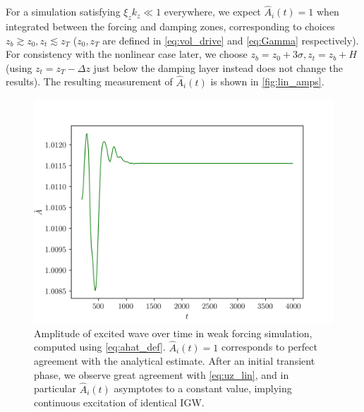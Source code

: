 \documentclass[
        fleqn,
        usenatbib,
    ]{mnras}
\begin{document}
For a simulation satisfying $\xi_z k_z \ll 1$ everywhere, we expect
$\hat{A}_i(t) = 1$ when integrated between the forcing and damping zones,
corresponding to choices $z_b \gtrsim z_0, z_t \lesssim z_T$ ($z_0, z_T$ are
defined in \autoref{eq:vol_drive} and \autoref{eq:Gamma} respectively). For
consistency with the nonlinear case later, we choose $z_b = z_0 + 3\sigma, z_t =
z_b + H$ (using $z_t = z_T - \Delta z$ just below the damping layer instead does
not change the results). The resulting measurement of $\hat{A}_i(t)$ is shown in
\autoref{fig:lin_amps}.
\begin{figure}
    \centering
    \includegraphics[width=\columnwidth]{plots/lin_amps.png}
    \caption{Amplitude of excited wave over time in weak forcing simulation,
    computed using \autoref{eq:ahat_def}. $\hat{A}_i(t) = 1$ corresponds to
    perfect agreement with the analytical estimate. After an initial transient
    phase, we observe great agreement with \autoref{eq:uz_lin}, and in
    particular $\hat{A}_i(t)$ asymptotes to a constant value, implying continuous
    excitation of identical IGW.}\label{fig:lin_amps}
\end{figure}
\end{document}
